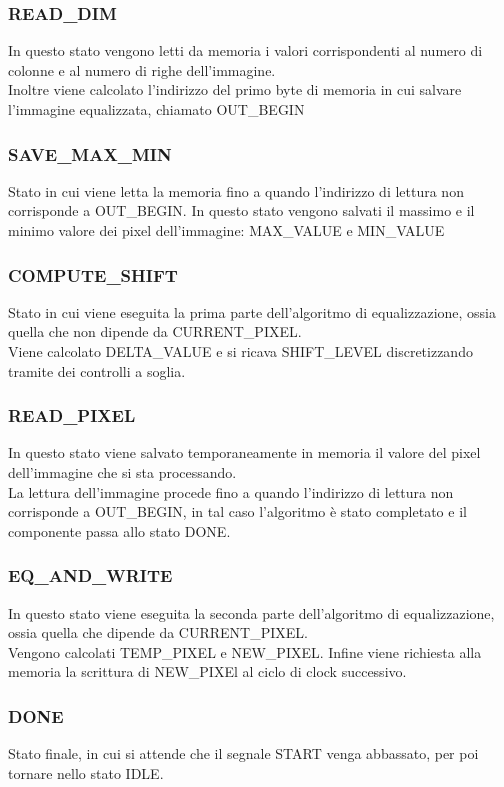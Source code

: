 \documentclass[a4paper, 12pt]{article}
\begin{document}
\subsubsection{READ\_DIM}
In questo stato vengono letti da memoria i valori corrispondenti al numero di colonne e al numero di righe dell'immagine. \\
Inoltre viene calcolato l'indirizzo del primo byte di memoria in cui salvare l'immagine equalizzata, chiamato OUT\_BEGIN
\subsubsection{SAVE\_MAX\_MIN}
Stato in cui viene letta la memoria fino a quando l'indirizzo di lettura non corrisponde a OUT\_BEGIN.
In questo stato vengono salvati il massimo e il minimo valore dei pixel dell'immagine: MAX\_VALUE e MIN\_VALUE
\subsubsection{COMPUTE\_SHIFT}
Stato in cui viene eseguita la prima parte dell'algoritmo di equalizzazione, ossia quella che non dipende da CURRENT\_PIXEL. \\
Viene calcolato DELTA\_VALUE e si ricava SHIFT\_LEVEL discretizzando tramite dei controlli a soglia.
\subsubsection{READ\_PIXEL}
In questo stato viene salvato temporaneamente in memoria il valore del pixel dell'immagine che si sta processando. \\
La lettura dell'immagine procede fino a quando l'indirizzo di lettura non corrisponde a OUT\_BEGIN, in tal caso l'algoritmo è stato completato e il componente passa allo stato DONE.
\subsubsection{EQ\_AND\_WRITE}
In questo stato viene eseguita la seconda parte dell'algoritmo di equalizzazione, ossia quella che dipende da CURRENT\_PIXEL. \\
Vengono calcolati TEMP\_PIXEL e NEW\_PIXEL.
Infine viene richiesta alla memoria la scrittura di NEW\_PIXEl al ciclo di clock successivo.
\subsubsection{DONE}
Stato finale, in cui si attende che il segnale START venga abbassato, per poi tornare nello stato IDLE. 
\end{document}
